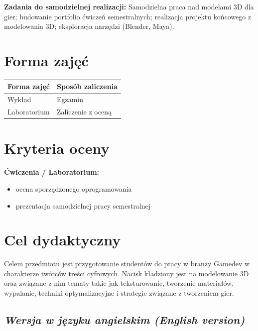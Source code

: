 \documentclass[12pt, a4paper]{article}
\newcommand{\thdrule}{\noalign{\global\setlength{\extrarowheight}{0pt}}}
\newcommand{\thdend}{\noalign{\global\setlength{\extrarowheight}{3pt}}}
\begin{document}
\vspace{4pt}
\noindent\textbf{Zadania do samodzielnej realizacji:} Samodzielna praca nad modelami 3D dla gier; budowanie portfolio ćwiczeń semestralnych; realizacja projektu końcowego z modelowania 3D; eksploracja narzędzi (Blender, Maya).

\section{Forma zajęć}

\begin{center}
{\scriptsize
\begin{tabular}{m{5cm}m{8cm}}
\thdrule\toprule
\rowcolor{pjatkRed} {\color{white}\textbf{Forma zajęć}} & {\color{white}\textbf{Sposób zaliczenia}} \\
\midrule\thdend
  \rowcolor{tableRowLight} Wykład & Egzamin \\
  \rowcolor{tableRowAlt} Laboratorium & Zaliczenie z oceną \\
\bottomrule
\end{tabular}}
\end{center}

\section{Kryteria oceny}

\textbf{Ćwiczenia / Laboratorium:}
\begin{itemize}
  \item ocena sporządzonego oprogramowania
  \item prezentacja samodzielnej pracy semestralnej
\end{itemize}


\section{Cel dydaktyczny}

Celem przedmiotu jest przygotowanie studentów do pracy w branży Gamedev w charakterze twórców treści cyfrowych. Nacisk kładziony jest na modelowanie 3D oraz związane z nim tematy takie jak teksturowanie, tworzenie materiałów, wypalanie, techniki optymalizacyjne i strategie związane z tworzeniem gier.

\subsection*{\textit{Wersja w języku angielskim (English version)}}
\end{document}
